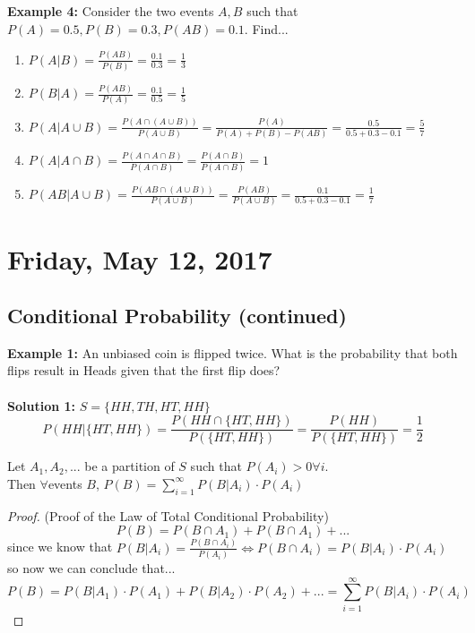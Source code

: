 \documentclass[12pt]{article}
\begin{document}
\textbf{Example 4:} Consider the two events $A,B$ such that\\
$P(A) = 0.5, P(B) = 0.3, P(AB) = 0.1$. Find...
\begin{enumerate}
	\item{$P(A|B) = \frac{P(AB)}{P(B)} = \frac{0.1}{0.3} = \frac{1}{3}$}
	\item{$P(B|A) = \frac{P(AB)}{P(A)} = \frac{0.1}{0.5} = \frac{1}{5}$}
	\item{$P(A|A\cup B) = \frac{P(A\cap(A\cup B))}{P(A \cup B)} = \frac{P(A)}{P(A)+P(B)-P(AB)} = \frac{0.5}{0.5+0.3-0.1} = \frac{5}{7}$}
	\item{$P(A|A\cap B) = \frac{P(A\cap A\cap B)}{P(A\cap B)} = \frac{P(A\cap B)}{P(A\cap B)} =1$}
	\item{$P(AB | A\cup B) = \frac{P(AB \cap (A\cup B))}{P(A \cup B)} = \frac{P(AB)}{P(A\cup B)} = \frac{0.1}{0.5+0.3-0.1} = \frac{1}{7}$}
\end{enumerate}

\newpage

\section{Friday, May 12, 2017}

\subsection{Conditional Probability (continued)}

\textbf{Example 1:} An unbiased coin is flipped twice. What is the probability that both flips result in Heads given that the first flip does?\\
\\
\textbf{Solution 1:} $S = \{ HH, TH, HT, HH \}$\\
$$P(HH | \{ HT, HH \}) = \frac{P(HH \cap \{ HT, HH \})}{P(\{ HT, HH \})} = \frac{P(HH)}{P(\{ HT, HH \})} = \frac{1}{2}$$

\begin{tcolorbox}[title=Theorem: Law of Total Conditional Probability]
	Let $A_1, A_2, ...$ be a partition of $S$ such that $P(A_i) > 0 \forall i$.\\
	Then $\forall$events $B$, $P(B) = \sum\limits_{i=1}^{\infty} P(B | A_i)\cdot P(A_i)$
\end{tcolorbox}

\begin{proof}
	(Proof of the Law of Total Conditional Probability)\\
	$$P(B) = P(B \cap A_1) + P(B \cap A_1) + ...$$
	since we know that $P(B | A_i) = \frac{P(B \cap A_i)}{P(A_i)} \Longleftrightarrow P(B \cap A_i) = P(B | A_i)\cdot P(A_i)$\\
	so now we can conclude that...\\
	$$P(B) = P(B | A_1)\cdot P(A_1) + P(B | A_2)\cdot P(A_2) + ... = \sum\limits_{i=1}^{\infty} P(B | A_i)\cdot P(A_i)$$
\end{proof}
\end{document}

